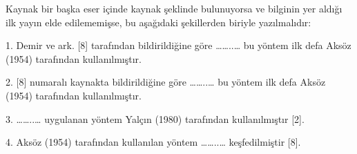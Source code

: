 	Kaynak bir başka eser içinde kaynak şeklinde bulunuyorsa ve bilginin yer aldığı ilk yayın elde edilememişse, bu aşağıdaki şekillerden biriyle yazılmalıdır:
	
	1.	Demir ve ark. [8] tarafından bildirildiğine göre ……..… bu yöntem ilk defa Aksöz (1954) tarafından kullanılmıştır.
	
	2.	[8] numaralı kaynakta bildirildiğine göre ……..… bu yöntem ilk defa Aksöz (1954) tarafından kullanılmıştır.
	
	3.	……..… uygulanan yöntem Yalçın (1980) tarafından kullanılmıştır [2].
	
	4.	Aksöz (1954) tarafından kullanılan yöntem ……..… keşfedilmiştir [8].
	





